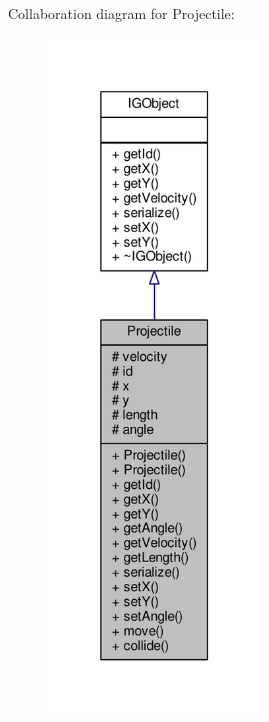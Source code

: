 Collaboration diagram for Projectile\+:\nopagebreak
\begin{figure}[H]
\begin{center}
\leavevmode
\includegraphics[width=160pt]{class_projectile__coll__graph}
\end{center}
\end{figure}
